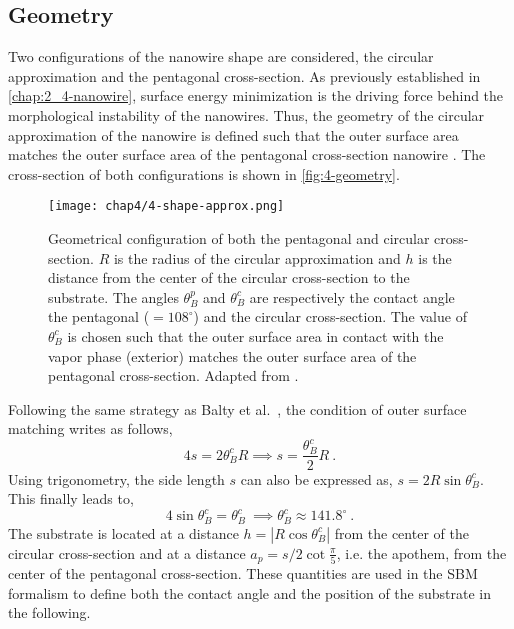 \subsection{Geometry}
    Two configurations of the nanowire shape are considered, the circular approximation and the pentagonal cross-section. As previously established in \autoref{chap:2_4-nanowire}, surface energy minimization is the driving force behind the morphological instability of the nanowires. Thus, the geometry of the circular approximation of the nanowire is defined such that the outer surface area matches the outer surface area of the pentagonal cross-section nanowire \cite{BaltyBaretSilhanekNguyen2024}. The cross-section of both configurations is shown in \autoref{fig:4-geometry}.
    \begin{figure}[H]
        \centering
        \texttt{[image: chap4/4-shape-approx.png]}
        \caption{Geometrical configuration of both the pentagonal and circular cross-section. $R$ is the radius of the circular approximation and $h$ is the distance from the center of the circular cross-section to the substrate. The angles $\theta^p_B$ and $\theta^c_B$ are respectively the contact angle the pentagonal ($=108^\circ$) and the circular cross-section. The value of $\theta^c_B$ is chosen such that the outer surface area in contact with the vapor phase (exterior) matches the outer surface area of the pentagonal cross-section. Adapted from \cite{BaltyBaretSilhanekNguyen2024}.}
        \label{fig:4-geometry}
    \end{figure}
    Following the same strategy as Balty et al.~\cite{BaltyBaretSilhanekNguyen2024}, the condition of outer surface matching writes as follows,
    \begin{equation}
        4 s = 2 \theta^c_B R \implies s = \frac{\theta^c_B}{2} R\ .
    \end{equation}
    Using trigonometry, the side length $s$ can also be expressed as, $s=2R\sin{\theta^c_B}$. This finally leads to,
    \begin{equation}
        4 \sin{\theta^c_B} = \theta^c_B\ \implies \theta^c_B \approx 141.8^\circ\ .
    \end{equation}
    The substrate is located at a distance $h=|R\cos{\theta^c_B}|$ from the center of the circular cross-section and at a distance $a_p=s/2\cot{\frac{\pi}{5}}$, i.e. the apothem, from the center of the pentagonal cross-section. These quantities are used in the SBM formalism to define both the contact angle and the position of the substrate in the following.

